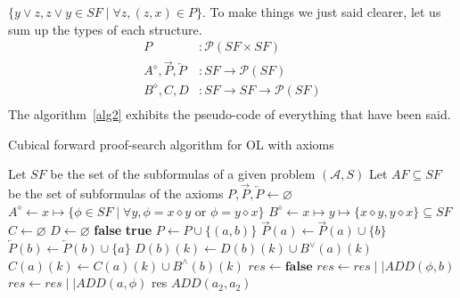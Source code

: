 \documentclass[a4paper, 11pt]{article}
\begin{document}
    $\{y\vee z,z\vee y\in SF\mid\forall z,(z,x)\in P\}$. To make things we just said clearer, let us sum 
    up the types of each structure.
    \begin{align*}
	    P&:\mathcal{P}(SF\times SF)\\
	    A^\diamond,\overrightarrow{P},\overleftarrow{P}&:SF\rightarrow\mathcal{P}(SF)\\
	    B^\diamond,C,D&:SF\rightarrow SF\rightarrow\mathcal{P}(SF)\\
    \end{align*}
    The algorithm~\ref{alg2} exhibits the pseudo-code of everything that have been said.
    \begin{algorithm}
	    \caption{Cubical forward proof-search algorithm for OL with axioms}
	    \label{alg2}
	    \begin{algorithmic}
		\State Let $SF$ be the set of the subformulas of a given problem $(\mathcal{A},S)$
		\State Let $AF\subseteq SF$ be the set of subformulas of the axioms
		    \State $P,\overrightarrow{P},\overleftarrow{P}\gets\varnothing$
		    \State $A^\diamond\gets x\mapsto\{\phi\in SF\mid\forall y,\phi=x\diamond y\text{ or }
		    \phi=y\diamond x\}$
		\State $B^\diamond\gets x\mapsto y\mapsto \{x\diamond y,y\diamond x\}\subseteq SF$
		\State $C\gets\varnothing$
		\State $D\gets\varnothing$
			\State\Return\textbf{false}
			\EndIf
			\State \Return \textbf{true}
			\EndIf
			\State $P\gets P\cup\{(a,b)\}$
			\State $\overrightarrow{P}(a)\gets\overrightarrow{P}(a)\cup\{b\}$
			\State $\overleftarrow{P}(b)\gets\overleftarrow{P}(b)\cup\{a\}$
			\State $D(b)(k)\gets D(b)(k)\cup B^\vee(a)(k)$
			\EndFor
			\State $C(a)(k)\gets C(a)(k)\cup B^\wedge(b)(k)$
			\EndFor	
			\State $res\gets \textbf{false}$
			\State $res\gets res\mid\mid ADD(\phi,b)$
			\EndFor
			\State $res\gets res\mid\mid ADD(a,\phi)$
			\EndFor
			\State \Return res
		\EndProcedure
		    \State $ADD(a_2,a_2)$
		    \EndFor
	    \end{algorithmic}
    \end{algorithm}
\end{document}
